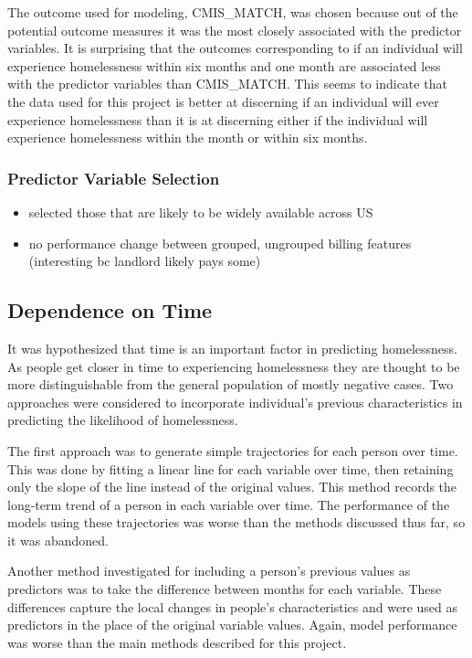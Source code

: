 \documentclass[10pt,letterpaper]{article}
\newcommand{\red}[1]{{\color{red}{#1}}}
\begin{document}
The outcome used for modeling, CMIS\_MATCH, was chosen because out of the potential outcome measures it was the most closely associated with the predictor variables. It is surprising that the outcomes corresponding to if an individual will experience homelessness within six months and one month are associated less with the predictor variables than CMIS\_MATCH. This seems to indicate that the data used for this project is better at discerning if an individual will ever experience homelessness than it is at discerning either if the individual will experience homelessness within the month or within six months.

\subsubsection*{Predictor Variable Selection}
\begin{itemize}
    \item selected those that are likely to be widely available across US
    \item no performance change between grouped, ungrouped billing features (interesting bc landlord likely pays some)
\end{itemize}
\red{REMOVE THIS subsubsection?}

\subsection*{Dependence on Time}
It was hypothesized that time is an important factor in predicting homelessness. As people get closer in time to experiencing homelessness they are thought to be more distinguishable from the general population of mostly negative cases. Two approaches were considered to incorporate individual's previous characteristics in predicting the likelihood of homelessness.

The first approach was to generate simple trajectories for each person over time. This was done by fitting a linear line for each variable over time, then retaining only the slope of the line instead of the original values. This method records the long-term trend of a person in each variable over time. The performance of the models using these trajectories was worse than the methods discussed thus far, so it was abandoned.

Another method investigated for including a person's previous values as predictors was to take the difference between months for each variable. These differences capture the local changes in people's characteristics and were used as predictors in the place of the original variable values. Again, model performance was worse than the main methods described for this project.
\end{document}
